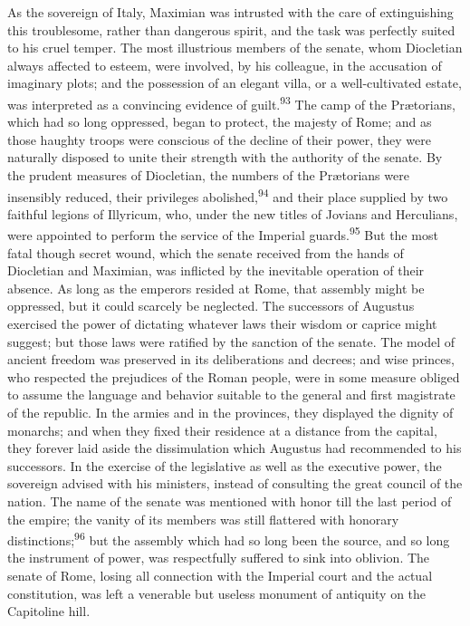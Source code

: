 As the sovereign of Italy, Maximian was intrusted with the care
of extinguishing this troublesome, rather than dangerous spirit,
and the task was perfectly suited to his cruel temper. The most
illustrious members of the senate, whom Diocletian always
affected to esteem, were involved, by his colleague, in the
accusation of imaginary plots; and the possession of an elegant
villa, or a well-cultivated estate, was interpreted as a
convincing evidence of guilt.\textsuperscript{93} The camp of the Prætorians,
which had so long oppressed, began to protect, the majesty of
Rome; and as those haughty troops were conscious of the decline
of their power, they were naturally disposed to unite their
strength with the authority of the senate. By the prudent
measures of Diocletian, the numbers of the Prætorians were
insensibly reduced, their privileges abolished,\textsuperscript{94} and their
place supplied by two faithful legions of Illyricum, who, under
the new titles of Jovians and Herculians, were appointed to
perform the service of the Imperial guards.\textsuperscript{95} But the most fatal
though secret wound, which the senate received from the hands of
Diocletian and Maximian, was inflicted by the inevitable
operation of their absence. As long as the emperors resided at
Rome, that assembly might be oppressed, but it could scarcely be
neglected. The successors of Augustus exercised the power of
dictating whatever laws their wisdom or caprice might suggest;
but those laws were ratified by the sanction of the senate. The
model of ancient freedom was preserved in its deliberations and
decrees; and wise princes, who respected the prejudices of the
Roman people, were in some measure obliged to assume the language
and behavior suitable to the general and first magistrate of the
republic. In the armies and in the provinces, they displayed the
dignity of monarchs; and when they fixed their residence at a
distance from the capital, they forever laid aside the
dissimulation which Augustus had recommended to his successors.
In the exercise of the legislative as well as the executive
power, the sovereign advised with his ministers, instead of
consulting the great council of the nation. The name of the
senate was mentioned with honor till the last period of the
empire; the vanity of its members was still flattered with
honorary distinctions;\textsuperscript{96} but the assembly which had so long been
the source, and so long the instrument of power, was respectfully
suffered to sink into oblivion. The senate of Rome, losing all
connection with the Imperial court and the actual constitution,
was left a venerable but useless monument of antiquity on the
Capitoline hill.

